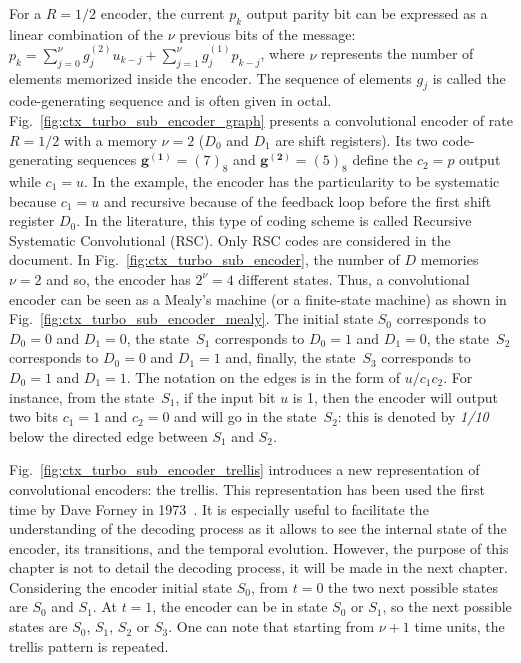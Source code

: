 For a $R=1/2$ encoder, the current $p_k$ output parity bit can be expressed as a
linear combination of the $\nu$ previous bits of the message:
$p_k = \sum_{j=0}^\nu g^{(2)}_{j} u_{k-j} + \sum_{j=1}^\nu g^{(1)}_{j} p_{k-j}$,
where $\nu$ represents the number of elements memorized inside the encoder.
The sequence of elements $g_j$ is called the code-generating sequence and is
often given in octal. Fig.~\ref{fig:ctx_turbo_sub_encoder_graph} presents a
convolutional encoder of rate $R = 1/2$ with a memory $\nu = 2$ ($D_0$ and $D_1$
are shift registers). Its two code-generating sequences $\bm{g^{(1)}} = (7)_8$
and $\bm{g^{(2)}} = (5)_8$ define the $c_2 = p$ output while $c_1 = u$. In
the example, the encoder has the particularity to be systematic because
$c_1 = u$ and recursive because of the feedback loop before the first shift
register $D_0$. In the literature, this type of coding scheme is called
Recursive Systematic Convolutional (RSC). Only RSC codes are considered in the
document. In Fig.~\ref{fig:ctx_turbo_sub_encoder}, the number of $D$ memories
$\nu = 2$ and so, the encoder has $2^\nu = 4$ different states. Thus, a
convolutional encoder can be seen as a Mealy's machine (or a finite-state
machine) as shown in Fig.~\ref{fig:ctx_turbo_sub_encoder_mealy}. The initial
state $S_0$ corresponds to $D_0 = 0$ and $D_1 = 0$, the state~$S_1$ corresponds
to $D_0 = 1$ and $D_1 = 0$, the state~$S_2$ corresponds to $D_0 = 0$ and
$D_1 = 1$ and, finally, the state~$S_3$ corresponds to $D_0 = 1$ and $D_1 = 1$.
The notation on the edges is in the form of $u/c_1c_2$. For instance, from the
state~$S_1$, if the input bit $u$ is 1, then the encoder will output two bits
$c_1 = 1$ and $c_2 = 0$ and will go in the state~$S_2$: this is denoted by
\emph{1/10} below the directed edge between $S_1$ and $S_2$.

Fig.~\ref{fig:ctx_turbo_sub_encoder_trellis} introduces a new representation of
convolutional encoders: the trellis. This representation has been used the first
time by Dave Forney in 1973~\cite{Forney1973}. It is especially useful to
facilitate the understanding of the decoding process as it allows to see the
internal state of the encoder, its transitions, and the temporal evolution.
However, the purpose of this chapter is not to detail the decoding process, it
will be made in the next chapter. Considering the encoder initial state $S_0$,
from $t = 0$ the two next possible states are $S_0$ and $S_1$. At $t = 1$, the
encoder can be in state $S_0$ or $S_1$, so the next possible states are $S_0$,
$S_1$, $S_2$ or $S_3$. One can note that starting from $\nu +1$ time units, the
trellis pattern is repeated.

